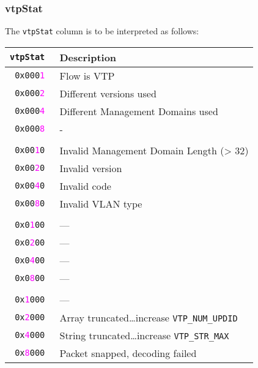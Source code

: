 \documentclass[documentation]{subfiles}
\begin{document}
\subsubsection{vtpStat}\label{vtpStat}
The {\tt vtpStat} column is to be interpreted as follows:
\begin{longtable}{>{\tt}rl}
    \toprule
    {\bf vtpStat} & {\bf Description}\\
    \midrule\endhead%
    0x000\textcolor{magenta}{1} & Flow is VTP\\
    0x000\textcolor{magenta}{2} & Different versions used\\
    0x000\textcolor{magenta}{4} & Different Management Domains used\\
    0x000\textcolor{magenta}{8} & -\\
    \\
    0x00\textcolor{magenta}{1}0 & Invalid Management Domain Length (> 32)\\
    0x00\textcolor{magenta}{2}0 & Invalid version\\
    0x00\textcolor{magenta}{4}0 & Invalid code\\
    0x00\textcolor{magenta}{8}0 & Invalid VLAN type\\
    \\
    0x0\textcolor{magenta}{1}00 & ---\\
    0x0\textcolor{magenta}{2}00 & ---\\
    0x0\textcolor{magenta}{4}00 & ---\\
    0x0\textcolor{magenta}{8}00 & ---\\
    \\
    0x\textcolor{magenta}{1}000 & ---\\
    0x\textcolor{magenta}{2}000 & Array truncated\ldots increase {\tt VTP\_NUM\_UPDID}\\
    0x\textcolor{magenta}{4}000 & String truncated\ldots increase {\tt VTP\_STR\_MAX}\\
    0x\textcolor{magenta}{8}000 & Packet snapped, decoding failed\\
    \bottomrule
\end{longtable}
\end{document}

